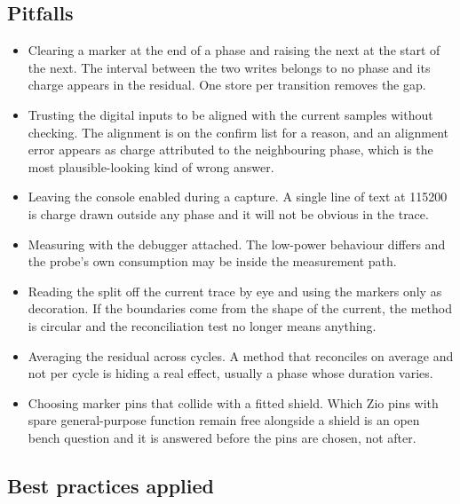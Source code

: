 \subsection*{Pitfalls}

\begin{itemize}
\item Clearing a marker at the end of a phase and raising the next at the start
of the next. The interval between the two writes belongs to no phase and its
charge appears in the residual. One store per transition removes the gap.
\item Trusting the digital inputs to be aligned with the current samples without
checking. The alignment is on the confirm list for a reason, and an alignment
error appears as charge attributed to the neighbouring phase, which is the most
plausible-looking kind of wrong answer.
\item Leaving the console enabled during a capture. A single line of text at
115200 is charge drawn outside any phase and it will not be obvious in the trace.
\item Measuring with the debugger attached. The low-power behaviour differs and
the probe's own consumption may be inside the measurement path.
\item Reading the split off the current trace by eye and using the markers only
as decoration. If the boundaries come from the shape of the current, the method
is circular and the reconciliation test no longer means anything.
\item Averaging the residual across cycles. A method that reconciles on average
and not per cycle is hiding a real effect, usually a phase whose duration varies.
\item Choosing marker pins that collide with a fitted shield. Which Zio pins with
spare general-purpose function remain free alongside a shield is an open bench
question and it is answered before the pins are chosen, not after.
\end{itemize}

\subsection*{Best practices applied}

